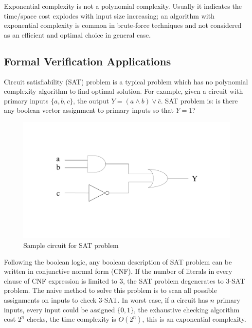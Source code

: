 \documentclass[11pt,twoside, onecolumn]{IEEEtran}
\begin{document}
Exponential complexity is not a polynomial complexity. Usually it indicates the time/space cost explodes
with input size increasing; an algorithm with exponential complexity is common in brute-force techniques
and not considered as an efficient and optimal choice in general case.

\subsection{Formal Verification Applications}
\label{sec:3sat}
Circuit satisfiability (SAT) problem is a typical problem which has no polynomial complexity algorithm
to find optimal solution. For example, given a circuit with primary inputs $\{a,b,c\}$, the output
$Y = (a \land b) \lor \bar{c}$. SAT problem is: is there any boolean vector assignment to primary inputs
so that $Y = 1$?

\begin{figure}[hbt]
	\begin{center}
	\includegraphics[scale=0.4]{fig_SAT.pdf}
	\end{center}
	\caption{Sample circuit for SAT problem}
	\label{fig:SAT}
\end{figure}

Following the boolean logic, any boolean description of SAT problem can be written in conjunctive
normal form (CNF). If the number of literals in every clause of CNF expression is limited to 3, 
the SAT problem degenerates to 3-SAT problem. The naive method to solve this problem is to scan
all possible assignments on inputs to check 3-SAT. In worst case, if a circuit has $n$ primary
inputs, every input could be assigned $\{0,1\}$, the exhaustive checking algorithm cost $2^n$ checks,
the time complexity is $O(2^n)$, this is an exponential complexity.
\end{document}
